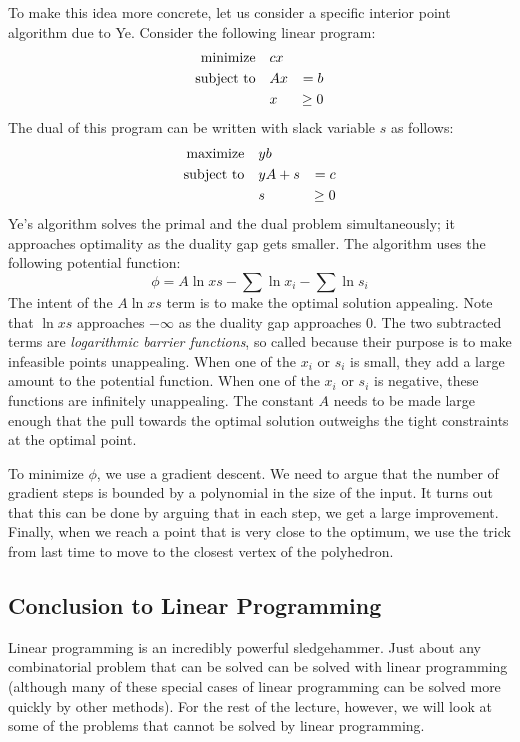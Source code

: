 \documentclass{article}
\begin{document}
To make this idea more concrete, let us consider a specific interior point
algorithm due to Ye.  Consider the following linear program:
{\setlength\arraycolsep{2pt}
\begin{eqnarray*}
\textrm{minimize\quad} & cx &\\
\textrm{subject to\quad} & Ax &=  b\\
                         & x &\ge 0\\
\end{eqnarray*}
}
The dual of this program can be written with slack variable $s$ as follows:
{\setlength\arraycolsep{2pt}
\begin{eqnarray*}
\textrm{maximize\quad} & yb &\\
\textrm{subject to\quad} & yA + s &=  c\\
                         & s &\ge 0\\
\end{eqnarray*}
}
Ye's algorithm solves the primal and the dual problem simultaneously;
it approaches optimality as the duality gap gets smaller.
The algorithm uses the following potential function:
\[
\phi = A\ln xs - \sum\ln x_i - \sum\ln s_i
\]
The intent of the $A\ln xs$ term is to make the optimal solution
appealing.  Note that $\ln xs$ approaches $-\infty$ as the duality gap
approaches 0.  The two subtracted terms are \textit{logarithmic
barrier functions}, so called because their purpose is to make
infeasible points unappealing.  When one of the $x_i$ or $s_i$ is
small, they add a large amount to the potential function.  When one of
the $x_i$ or $s_i$ is negative, these functions are infinitely
unappealing.  The constant $A$ needs to be made large enough that the
pull towards the optimal solution outweighs the tight constraints at
the optimal point.

To minimize $\phi$, we use a gradient descent.  We need to argue that
the number of gradient steps is bounded by a polynomial in the size of
the input.  It turns out that this can be done by arguing that in each
step, we get a large improvement.  Finally, when we reach a point that
is very close to the optimum, we use the trick from last time to move
to the closest vertex of the polyhedron.

\subsection{Conclusion to Linear Programming}

Linear programming is an incredibly powerful sledgehammer.  Just about
any combinatorial problem that can be solved can be solved with linear
programming (although many of these special cases of linear
programming can be solved more quickly by other methods).  For the
rest of the lecture, however, we will look at some of the problems
that cannot be solved by linear programming.
\end{document}
